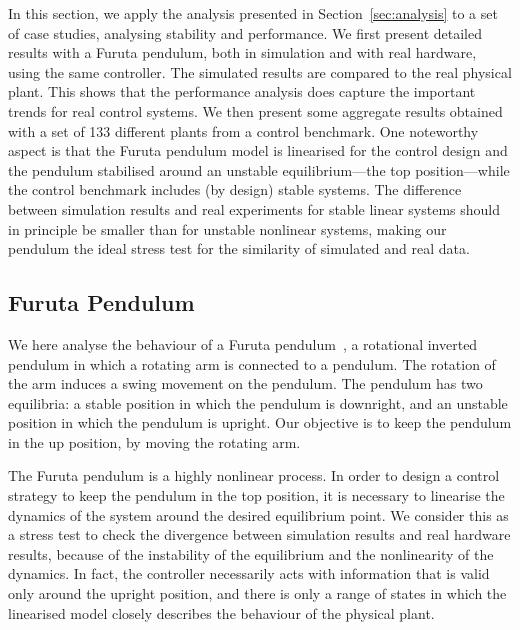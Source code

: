 In this section, we apply the analysis presented in Section~\ref{sec:analysis} to a set of case studies, analysing stability and performance. 
We first present detailed results with a Furuta pendulum, both in simulation and with real hardware, using the same controller. 
The simulated results are compared to the real physical plant. 
This shows that the performance analysis does capture the important trends for real control systems.
We then present some aggregate results obtained with a set of 133 different plants from a control benchmark.
One noteworthy aspect is that the Furuta pendulum model is linearised for the control design and the pendulum stabilised around an unstable equilibrium---the top position---while the control benchmark includes (by design) stable systems. 
The difference between simulation results and real experiments for stable linear systems should in principle be smaller than for unstable nonlinear systems, making our pendulum the ideal stress test for the similarity of simulated and real data.

\subsection{Furuta Pendulum}
\label{sec:example}

We here analyse the behaviour of a Furuta pendulum~\cite{Furuta:1992}, a rotational inverted pendulum in which a rotating arm is connected to a pendulum. 
The rotation of the arm induces a swing movement on the pendulum. 
The pendulum has two equilibria: a stable position in which the pendulum is downright, and an unstable position in which the pendulum is upright. 
Our objective is to keep the pendulum in the up position, by moving the rotating arm.

The Furuta pendulum is a highly nonlinear process. 
In order to design a control strategy to keep the pendulum in the top position, it is necessary to linearise the dynamics of the system around the desired equilibrium point. 
We consider this as a stress test to check the divergence between simulation results and real hardware results, because of the instability of the equilibrium and the nonlinearity of the dynamics. 
In fact, the controller necessarily acts with information that is valid only around the upright position, and there is only a range of states in which the linearised model closely describes the behaviour of the physical plant.

